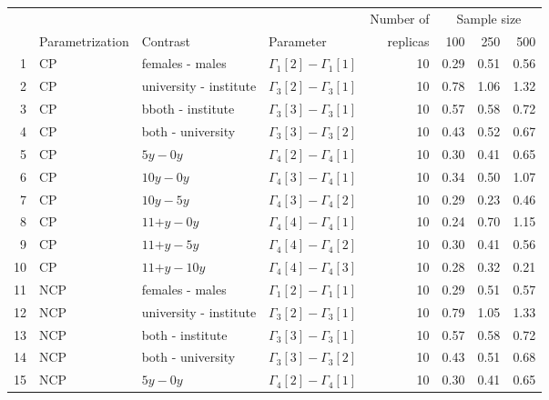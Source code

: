 %
\begin{table}[H]
	\centering
	\begin{tabular}{rlllrrrr}		
		\hline
		\multicolumn{4}{c}{ } & Number of &\multicolumn{3}{c}{ Sample size } \\ 
		\cmidrule(rl){6-8}
		& Parametrization & Contrast & Parameter & replicas & 100 & 250 & 500 \\ 
		\hline\hline
		1 & CP & \footnotesize{females - males} & $\Gamma_{1}[2] - \Gamma_{1}[1]$ & 10 & 0.29 & 0.51 & 0.56 \\ 
		2 & CP & \footnotesize{university -  institute} & $\Gamma_{3}[2] - \Gamma_{3}[1]$ & 10 & 0.78 & 1.06 & 1.32 \\ 
		3 & CP & b\footnotesize{both -  institute} & $\Gamma_{3}[3] - \Gamma_{3}[1]$ & 10 & 0.57 & 0.58 & 0.72 \\ 
		4 & CP & \footnotesize{both - university} & $\Gamma_{3}[3] - \Gamma_{3}[2]$ & 10 & 0.43 & 0.52 & 0.67 \\
		5 & CP & \footnotesize{$5y - 0y$} & $\Gamma_{4}[2] - \Gamma_{4}[1]$ & 10 & 0.30 & 0.41 & 0.65 \\ 
		6 & CP & \footnotesize{$10y - 0y$} & $\Gamma_{4}[3] - \Gamma_{4}[1]$ & 10 & 0.34 & 0.50 & 1.07 \\
		7 & CP & \footnotesize{$10y - 5y$} & $\Gamma_{4}[3] - \Gamma_{4}[2]$ & 10 & 0.29 & 0.23 & 0.46 \\
		8 & CP & \footnotesize{$11\text{+}y - 0y$} & $\Gamma_{4}[4] - \Gamma_{4}[1]$ & 10 & 0.24 & 0.70 & 1.15 \\ 
		9 & CP & \footnotesize{$11\text{+}y - 5y$} & $\Gamma_{4}[4] - \Gamma_{4}[2]$ & 10 & 0.30 & 0.41 & 0.56 \\  
		10 & CP & \footnotesize{$11\text{+}y - 10y$} & $\Gamma_{4}[4] - \Gamma_{4}[3]$ & 10 & 0.28 & 0.32 & 0.21 \\
		\hline
		11 & NCP & \footnotesize{females - males} & $\Gamma_{1}[2] - \Gamma_{1}[1]$ & 10 & 0.29 & 0.51 & 0.57 \\ 
		12 & NCP & \footnotesize{university -  institute} & $\Gamma_{3}[2] - \Gamma_{3}[1]$ & 10 & 0.79 & 1.05 & 1.33 \\
		13 & NCP & \footnotesize{both -  institute} & $\Gamma_{3}[3] - \Gamma_{3}[1]$ & 10 & 0.57 & 0.58 & 0.72 \\ 
		14 & NCP & \footnotesize{both - university} & $\Gamma_{3}[3] - \Gamma_{3}[2]$ & 10 & 0.43 & 0.51 & 0.68 \\
		15 & NCP & \footnotesize{$5y - 0y$} & $\Gamma_{4}[2] - \Gamma_{4}[1]$ & 10 & 0.30 & 0.41 & 0.65 \\

\end{tabular}
\end{table}
